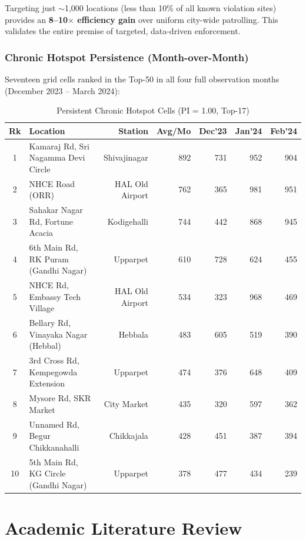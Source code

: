 \documentclass[12pt,a4paper]{article}
\begin{document}
Targeting just $\sim$1,000 locations (less than 10\% of all known violation sites) provides an \textbf{8--10$\times$ efficiency gain} over uniform city-wide patrolling. This validates the entire premise of targeted, data-driven enforcement.

\subsubsection{Chronic Hotspot Persistence (Month-over-Month)}

Seventeen grid cells ranked in the Top-50 in all four full observation months (December 2023 -- March 2024):

\begin{table}[H]
\centering
\caption{Persistent Chronic Hotspot Cells (PI = 1.00, Top-17)}
\small
\begin{tabular}{clrrrrr}
\toprule
\textbf{Rk} & \textbf{Location} & \textbf{Station} & \textbf{Avg/Mo} & \textbf{Dec'23} & \textbf{Jan'24} & \textbf{Feb'24} \\
\midrule
1 & Kamaraj Rd, Sri Nagamma Devi Circle & Shivajinagar & 892 & 731 & 952 & 904 \\
2 & NHCE Road (ORR) & HAL Old Airport & 762 & 365 & 981 & 951 \\
3 & Sahakar Nagar Rd, Fortune Acacia & Kodigehalli & 744 & 442 & 868 & 945 \\
4 & 6th Main Rd, RK Puram (Gandhi Nagar) & Upparpet & 610 & 728 & 624 & 455 \\
5 & NHCE Rd, Embassy Tech Village & HAL Old Airport & 534 & 323 & 968 & 469 \\
6 & Bellary Rd, Vinayaka Nagar (Hebbal) & Hebbala & 483 & 605 & 519 & 390 \\
7 & 3rd Cross Rd, Kempegowda Extension & Upparpet & 474 & 376 & 648 & 409 \\
8 & Mysore Rd, SKR Market & City Market & 435 & 320 & 597 & 362 \\
9 & Unnamed Rd, Begur Chikkanahalli & Chikkajala & 428 & 451 & 387 & 394 \\
10 & 5th Main Rd, KG Circle (Gandhi Nagar) & Upparpet & 378 & 477 & 434 & 239 \\
\bottomrule
\end{tabular}
\end{table}

\section{Academic Literature Review}
\end{document}
